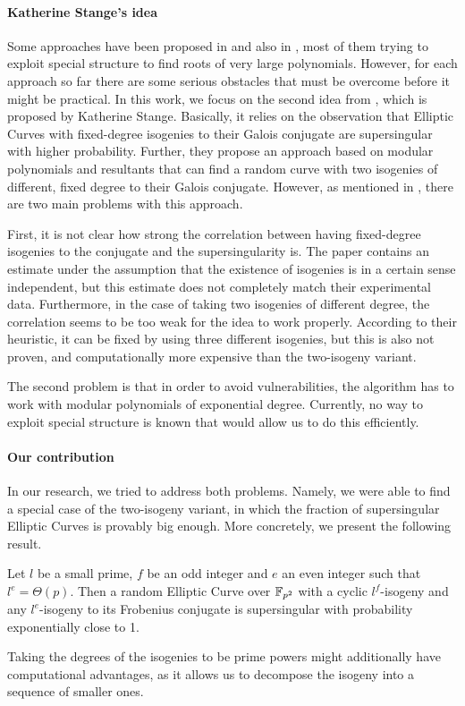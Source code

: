 \paragraph{Katherine Stange's idea} Some approaches have been proposed in \cite{base_paper} and also in \cite{concurrent_paper}, most of them trying to exploit special structure to find roots of very large polynomials.
However, for each approach so far there are some serious obstacles that must be overcome before it might be practical.
In this work, we focus on the second idea from \cite{base_paper}, which is proposed by Katherine Stange.
Basically, it relies on the observation that Elliptic Curves with fixed-degree isogenies to their Galois conjugate are supersingular with higher probability.
Further, they propose an approach based on modular polynomials and resultants that can find a random curve with two isogenies of different, fixed degree to their Galois conjugate.
However, as mentioned in \cite{base_paper}, there are two main problems with this approach.

First, it is not clear how strong the correlation between having fixed-degree isogenies to the conjugate and the supersingularity is.
The paper contains an estimate under the assumption that the existence of isogenies is in a certain sense independent, but this estimate does not completely match their experimental data.
Furthermore, in the case of taking two isogenies of different degree, the correlation seems to be too weak for the idea to work properly.
According to their heuristic, it can be fixed by using three different isogenies, but this is also not proven, and computationally more expensive than the two-isogeny variant.

The second problem is that in order to avoid vulnerabilities, the algorithm has to work with modular polynomials of exponential degree.
Currently, no way to exploit special structure is known that would allow us to do this efficiently.

\paragraph{Our contribution} In our research, we tried to address both problems.
Namely, we were able to find a special case of the two-isogeny variant, in which the fraction of supersingular Elliptic Curves is provably big enough.
More concretely, we present the following result.
\begin{prop}
    \label{prop:main_result1}
    Let $l$ be a small prime, $f$ be an odd integer and $e$ an even integer such that $l^e = \Theta(p)$.
    Then a random Elliptic Curve over $\mathbb{F}_{p^2}$ with a cyclic $l^f$-isogeny and any $l^e$-isogeny to its Frobenius conjugate is supersingular with probability exponentially close to 1.
\end{prop}
Taking the degrees of the isogenies to be prime powers might additionally have computational advantages, as it allows us to decompose the isogeny into a sequence of smaller ones.

